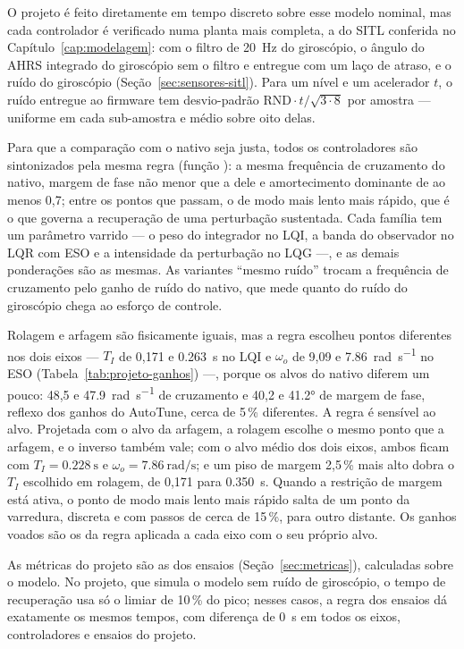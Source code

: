O projeto é feito diretamente em tempo discreto sobre esse modelo nominal,
mas cada controlador é verificado numa planta mais completa, a do SITL
conferida no Capítulo~\ref{cap:modelagem}: com o filtro de \SI{20}{\hertz}
do giroscópio, o ângulo do AHRS integrado do giroscópio sem o filtro e
entregue com um laço de atraso, e o ruído do giroscópio
(Seção~\ref{sec:sensores-sitl}). Para um nível  e um
acelerador $t$, o ruído entregue ao firmware tem desvio-padrão
$\mathrm{RND}\cdot t/\sqrt{3\cdot 8}$ por amostra --- uniforme em cada
sub-amostra e médio sobre oito delas.

Para que a comparação com o nativo seja justa, todos os controladores são
sintonizados pela mesma regra (função ): a mesma
frequência de cruzamento do nativo, margem de fase não menor que a dele e
amortecimento dominante de ao menos 0,7; entre os pontos que passam, o de modo
mais lento mais rápido, que é o que governa a recuperação de uma perturbação
sustentada. Cada família tem um parâmetro varrido --- o peso do integrador
no LQI, a banda do observador no LQR com ESO e a intensidade da perturbação
no LQG ---, e as demais ponderações são as mesmas. As variantes ``mesmo
ruído'' trocam a frequência de cruzamento pelo ganho de ruído do nativo, que
mede quanto do ruído do giroscópio chega ao esforço de controle.

Rolagem e arfagem são fisicamente iguais, mas a regra escolheu pontos
diferentes nos dois eixos --- $T_I$ de 0,171 e \SI{0.263}{\second} no LQI e
$\omega_o$ de 9,09 e \SI{7.86}{\radian\per\second} no ESO
(Tabela~\ref{tab:projeto-ganhos}) ---, porque os alvos do nativo diferem um
pouco: 48,5 e \SI{47.9}{\radian\per\second} de cruzamento e 40,2 e
\ang{41.2} de margem de fase, reflexo dos ganhos do AutoTune, cerca de 5\,\%
diferentes. A regra é sensível ao alvo. Projetada com o alvo da arfagem, a
rolagem escolhe o mesmo ponto que a arfagem, e o inverso também vale; com o
alvo médio dos dois eixos, ambos ficam com $T_I = \SI{0.228}{\second}$ e
$\omega_o = \SI{7.86}{\radian\per\second}$; e um piso de margem 2,5\,\% mais
alto dobra o $T_I$ escolhido em rolagem, de 0,171 para \SI{0.350}{\second}.
Quando a restrição de margem está ativa, o ponto de modo mais lento mais
rápido salta de um ponto da varredura, discreta e com passos de cerca de
15\,\%, para outro distante. Os ganhos voados são os da regra aplicada a cada
eixo com o seu próprio alvo.

As métricas do projeto são as dos ensaios (Seção~\ref{sec:metricas}),
calculadas sobre o modelo. No projeto, que simula o modelo sem ruído de
giroscópio, o tempo de recuperação usa só o limiar de 10\,\% do pico; nesses
casos, a regra dos ensaios dá exatamente os mesmos tempos, com diferença de
\SI{0}{\second} em todos os eixos, controladores e ensaios do projeto.

